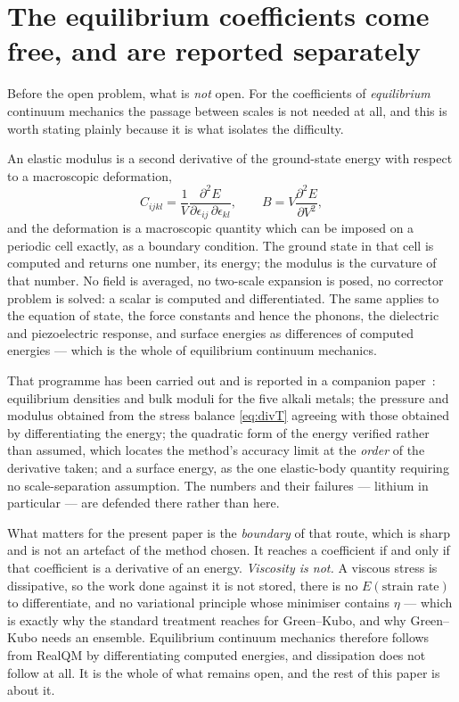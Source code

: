 \documentclass[11pt]{article}
\begin{document}
\section{The equilibrium coefficients come free, and are reported separately}\label{sec:equil}

Before the open problem, what is \emph{not} open. For the coefficients of \emph{equilibrium}
continuum mechanics the passage between scales is not needed at all, and this is worth stating
plainly because it is what isolates the difficulty.

An elastic modulus is a second derivative of the ground-state energy with respect to a macroscopic
deformation,
\begin{equation}\label{eq:modulus}
C_{ijkl}=\frac{1}{V}\frac{\partial^2 E}{\partial\epsilon_{ij}\,\partial\epsilon_{kl}},
\qquad
B = V\frac{\partial^2 E}{\partial V^2} ,
\end{equation}
and the deformation is a macroscopic quantity which can be imposed on a periodic cell exactly, as a
boundary condition. The ground state in that cell is computed and returns one number, its energy;
the modulus is the curvature of that number. No field is averaged, no two-scale expansion is posed,
no corrector problem is solved: a scalar is computed and differentiated. The same applies to the
equation of state, the force constants and hence the phonons, the dielectric and piezoelectric
response, and surface energies as differences of computed energies --- which is the whole of
equilibrium continuum mechanics.

That programme has been carried out and is reported in a companion paper~\cite{elasticity}:
equilibrium densities and bulk moduli for the five alkali metals; the pressure and modulus obtained
from the stress balance \eqref{eq:divT} agreeing with those obtained by differentiating the energy;
the quadratic form of the energy verified rather than assumed, which locates the method's accuracy
limit at the \emph{order} of the derivative taken; and a surface energy, as the one elastic-body
quantity requiring no scale-separation assumption. The numbers and their failures --- lithium in
particular --- are defended there rather than here.

What matters for the present paper is the \emph{boundary} of that route, which is sharp and is not an
artefact of the method chosen. It reaches a coefficient if and only if that coefficient is a
derivative of an energy. \emph{Viscosity is not.} A viscous stress is dissipative, so the work done
against it is not stored, there is no $E(\text{strain rate})$ to differentiate, and no variational
principle whose minimiser contains $\eta$ --- which is exactly why the standard treatment reaches
for Green--Kubo, and why Green--Kubo needs an ensemble. Equilibrium continuum mechanics therefore
follows from RealQM by differentiating computed energies, and dissipation does not follow at all. It
is the whole of what remains open, and the rest of this paper is about it.
\end{document}

